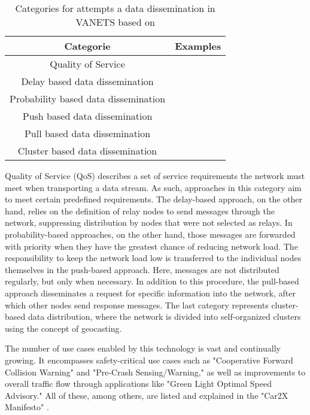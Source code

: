 \begin{table}[h]
\renewcommand{\figurename}{Figure}
\centering
\begin{tabular}{||c c||} 
 \hline
 Categorie & Examples \\ [0.5ex] 
 \hline\hline
 Quality of Service & \cite{wahab2013vanet}\cite{akamatsu2014adaptive}\\ 
 \hline
 Delay based data dissemination & \cite{salvo2013timer}\cite{sospeter2018effective} \\
 \hline
 Probability based data dissemination&\cite{wisitpongphan2007broadcast}\cite{tonguz2010dv} \cite{sospeter2018effective}\\
 \hline
Push based data dissemination & \cite{schwartz2011directional}\\
 \hline
Pull based data dissemination &\cite{mondal2015secure}\\
 \hline
Cluster based data dissemination & \cite{zhang2013smartgeocast}\\ [1ex] 
 \hline
\end{tabular}
\caption{Categories for attempts a data dissemination in VANETS based on \cite{rashid2020reliable} \cite{rashid2020overview}}
\label{Routingtabel}
\end{table}

Quality of Service (QoS) describes a set of service requirements the network must meet when transporting a data stream. As such, approaches in this category aim to meet certain predefined requirements. The delay-based approach, on the other hand, relies on the definition of relay nodes to send messages through the network, suppressing distribution by nodes that were not selected as relays. In probability-based approaches, on the other hand, those messages are forwarded with priority when they have the greatest chance of reducing network load. The responsibility to keep the network load low is transferred to the individual nodes themselves in the push-based approach. Here, messages are not distributed regularly, but only when necessary. In addition to this procedure, the pull-based approach disseminates a request for specific information into the network, after which other nodes send response messages. The last category represents cluster-based data distribution, where the network is divided into self-organized clusters using the concept of geocasting.

The number of use cases enabled by this technology is vast and continually growing. It encompasses safety-critical use cases such as "Cooperative Forward Collision Warning" and "Pre-Crash Sensing/Warning," as well as improvements to overall traffic flow through applications like "Green Light Optimal Speed Advisory." All of these, among others, are listed and explained in the "Car2X Manifesto" \cite{baldessari2007car}.